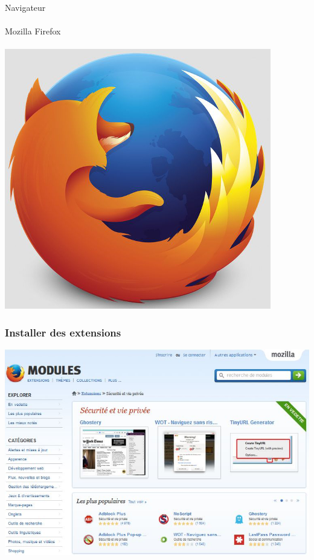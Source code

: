 \documentclass{beamer}
\begin{document}
\begin{frame}
\begin{center}
\Huge{Navigateur}\\~\\Mozilla Firefox\\~\\
\includegraphics[scale=0.3] {./images/firefox.jpg}
\end{center}
\end{frame}

\begin{frame}
\frametitle{Installer des extensions}
\begin{center}
\includegraphics[scale=0.75] {./images/extensions_firefox.jpg}
\end{center}
\end{frame}
\end{document}
